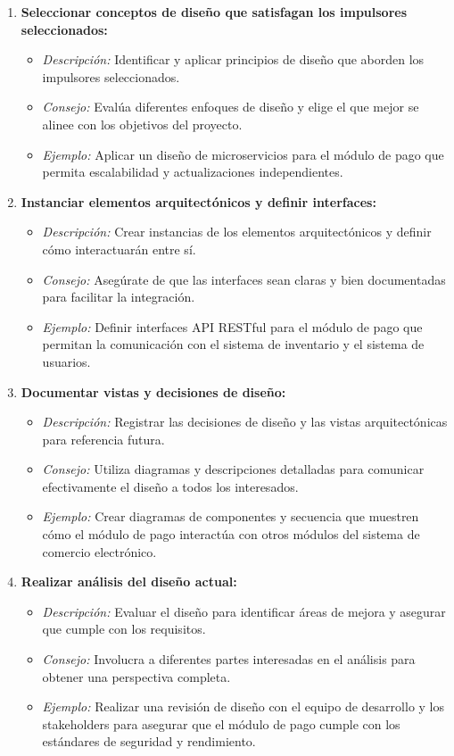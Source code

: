 \begin{enumerate}
    \item \textbf{Seleccionar conceptos de diseño que satisfagan los impulsores seleccionados:}
    \begin{itemize}
        \item \textit{Descripción:} Identificar y aplicar principios de diseño que aborden los impulsores seleccionados.
        \item \textit{Consejo:} Evalúa diferentes enfoques de diseño y elige el que mejor se alinee con los objetivos del proyecto.
        \item \textit{Ejemplo:} Aplicar un diseño de microservicios para el módulo de pago que permita escalabilidad y actualizaciones independientes.
    \end{itemize}
    
    \item \textbf{Instanciar elementos arquitectónicos y definir interfaces:}
    \begin{itemize}
        \item \textit{Descripción:} Crear instancias de los elementos arquitectónicos y definir cómo interactuarán entre sí.
        \item \textit{Consejo:} Asegúrate de que las interfaces sean claras y bien documentadas para facilitar la integración.
        \item \textit{Ejemplo:} Definir interfaces API RESTful para el módulo de pago que permitan la comunicación con el sistema de inventario y el sistema de usuarios.
    \end{itemize}
    
    \item \textbf{Documentar vistas y decisiones de diseño:}
    \begin{itemize}
        \item \textit{Descripción:} Registrar las decisiones de diseño y las vistas arquitectónicas para referencia futura.
        \item \textit{Consejo:} Utiliza diagramas y descripciones detalladas para comunicar efectivamente el diseño a todos los interesados.
        \item \textit{Ejemplo:} Crear diagramas de componentes y secuencia que muestren cómo el módulo de pago interactúa con otros módulos del sistema de comercio electrónico.
    \end{itemize}
    
    \item \textbf{Realizar análisis del diseño actual:}
    \begin{itemize}
        \item \textit{Descripción:} Evaluar el diseño para identificar áreas de mejora y asegurar que cumple con los requisitos.
        \item \textit{Consejo:} Involucra a diferentes partes interesadas en el análisis para obtener una perspectiva completa.
        \item \textit{Ejemplo:} Realizar una revisión de diseño con el equipo de desarrollo y los stakeholders para asegurar que el módulo de pago cumple con los estándares de seguridad y rendimiento.
    \end{itemize}
\end{enumerate}


